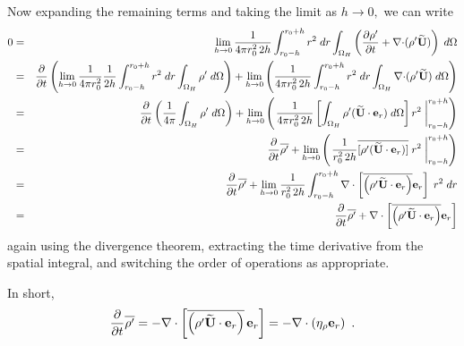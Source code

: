 Now expanding the remaining terms and taking the limit as $h \rightarrow 0,$ we can write 
\begin{eqnarray} 
0 &=& \lim_{h\rightarrow 0} \frac{1}{4\pi r_0^2 \, 2h} \int_{r_0-h}^{r_0+h} r^2 \; dr \int_{\Omega_H} 
    \left(\frac{\partial {\rho^{\prime}}}{\partial t} + \nabla \mathbf{\cdot} ( {\rho^{\prime}} \widetilde{{\bf U}} ) \right) \; d\Omega \nonumber \\
&=& \frac{\partial}{\partial t} \left( \lim_{h\rightarrow 0} \frac{1}{4\pi r_0^2} \frac{1}{2h} 
  \int_{r_0-h}^{r_0+h} r^2 \; dr \int_{\Omega_H}  {\rho^{\prime}} \;d\Omega \right) +
\lim_{h\rightarrow 0} \left( \frac{1}{4\pi r_0^2 \, 2h}  
  \int_{r_0-h}^{r_0+h} r^2 \; dr \int_{\Omega_H}  \nabla \mathbf{\cdot} ( {\rho^{\prime}} \widetilde{{\bf U}} ) \; d\Omega \right) \nonumber \\
&=& \frac{\partial}{\partial t} \left(\frac{1}{4\pi} \int_{\Omega_H}  {\rho^{\prime}} \; d\Omega \right) +
\lim_{h\rightarrow 0} \left( \left .  \frac{1}{4\pi r_0^2 \, 2h}  
\left [ \int_{\Omega_H} {\rho^{\prime}} (\widetilde{{\bf U}} \cdot \mathbf{e}_r) \; d\Omega  \right]  r^2\; \right |_{r_0-h}^{r_0+h} \right) \nonumber  \\
&=&  \frac{\partial}{\partial t} \overline{{\rho^{\prime}}} + \lim_{h\rightarrow 0} \left( \left .  \frac{1}{r_0^2 \, 2h}
\overline{[{\rho^{\prime}} (\widetilde{{\bf U}} \cdot \mathbf{e}_r)]} \; r^2 \; \right |_{r_0-h}^{r_0+h} \right) \nonumber  \\
&=&  \frac{\partial}{\partial t} \overline{{\rho^{\prime}}} + 
\lim_{h\rightarrow 0} \frac{1}{r_0^2 \, 2h} \int_{r_0-h}^{r_0+h} \nabla \cdot \left[\overline{\left({\rho^{\prime}}\widetilde{{\bf U}} \cdot \mathbf{e}_r\right)} \mathbf{e}_r \right]\;  r^2 \; dr \nonumber \\
&=&  \frac{\partial}{\partial t} \overline{{\rho^{\prime}}} + \nabla \cdot \left[ \overline{\left({\rho^{\prime}} \widetilde{{\bf U}} \cdot \mathbf{e}_r\right)} \mathbf{e}_r \right]
\end{eqnarray} 
again using the divergence theorem, extracting the time derivative from the spatial integral,
and switching the order of operations as appropriate.

In short, 
\begin{equation}
\frac{\partial}{\partial t} \overline{{\rho^{\prime}}} = 
- \nabla \cdot \left [ \overline{\left({\rho^{\prime}} \widetilde{{\bf U}} \cdot \mathbf{e}_r\right)} \, \mathbf{e}_r \right ] = 
- \nabla \cdot ( \eta_{\rho} \mathbf{e}_r )
 \enskip .\label{eq:rhopbar} 
\end{equation} 

